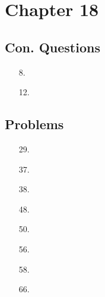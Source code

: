 \documentclass[12pt, letterpaper]{article}
\begin{document}
    \section*{Chapter 18}
    \subsection*{Con. Questions}
    \begin{enumerate}
        \item [8.]
        \item [12.]
    \end{enumerate}

    \subsection*{Problems}

    \begin{enumerate}
        \item [29.]
        \item [37.]
        \item [38.]
        \item [48.]
        \item [50.]
        \item [56.]
        \item [58.]
        \item [66.]
    \end{enumerate}
\end{document}
